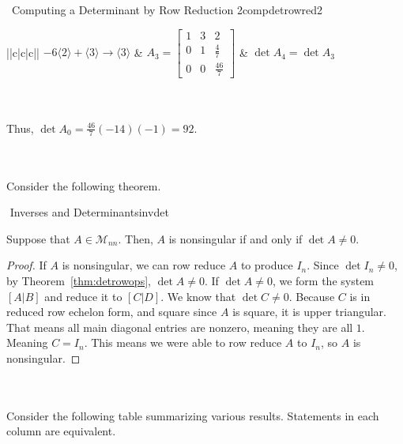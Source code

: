 \begin{example}{\Difficulty\,\Difficulty\,\,Computing a Determinant by Row Reduction 2}{compdetrowred2}
\begin{center}
\begin{tabular}{||c|c|c||}
                    \hline
                    \(-6\langle2\rangle+\langle3\rangle\to\langle3\rangle\) & \(A_3=\begin{bmatrix} 1 & 3 & 2 \\ 0 & 1 & \frac{4}{7} \\ 0 & 0 & \frac{46}{7} \end{bmatrix}\) & \(\det A_4=\det A_3\) \\
                    \hline
                \end{tabular}
            \end{center}
            \vphantom
            \\
            \\
            Thus, \(\det A_0=\frac{46}{7}(-14)(-1)=92\).

        \end{example}
        \vphantom
        \\
        \\
        Consider the following theorem.
        \begin{theorem}{\Stop\,\,Inverses and Determinants}{invdet}
            
            Suppose that \(A\in\mathcal{M}_{nn}\). Then, \(A\) is nonsingular if and only if \(\det A \neq 0\).
            \begin{proof}
                If \(A\) is nonsingular, we can row reduce \(A\) to produce \(I_n\). Since \(\det I_n\neq 0\), by Theorem~\ref{thm:detrowops}, \(\det A\neq 0\). If \(\det A\neq 0\), we form the system \([A|B]\) and reduce it to \([C|D]\). We know that \(\det C\neq 0\). Because \(C\) is in reduced row echelon form, and square since \(A\) is square, it is upper triangular. That means all main diagonal entries are nonzero, meaning they are all \(1\). Meaning \(C=I_n\). This means we were able to row reduce \(A\) to \(I_n\), so \(A\) is nonsingular.
            \end{proof}
            
        \end{theorem}
        \vphantom
        \\
        \\
        Consider the following table summarizing various results. Statements in each column are equivalent.
